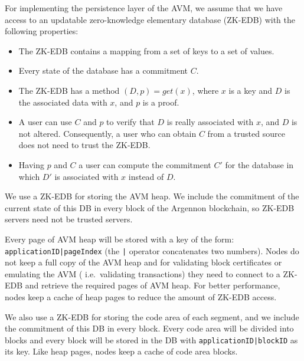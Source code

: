 

For implementing the persistence layer of the AVM, we assume that we have access to an updatable zero-knowledge
elementary database (ZK-EDB) with the following properties:

\begin{itemize}
    \item The ZK-EDB contains a mapping from a set of keys to a set of values.
    \item Every state of the database has a commitment \(C\).
    \item The ZK-EDB has a method \((D, p) = get(x)\), where \(x\) is a key and \(D\) is the associated data
    with \(x\), and \(p\) is a proof.
    \item A user can use \(C\) and \(p\) to verify that \(D\) is really associated with \(x\), and \(D\) is not
    altered. Consequently, a user who can obtain \(C\) from a trusted source does not need to trust the ZK-EDB\@.
    \item Having \(p\) and \(C\) a user can compute the commitment \(C'\) for the database in which \(D'\) is
    associated with \(x\) instead of \(D\).
\end{itemize}

We use a ZK-EDB for storing the AVM heap. We include the commitment of the current state of this DB in every
block of the Argennon blockchain, so ZK-EDB servers need not be trusted servers.

Every page of AVM heap will be stored with a key of the form: \texttt{applicationID|pageIndex} (the \texttt{|}
operator concatenates two numbers). Nodes do not keep a full copy of the AVM heap and for validating block
certificates or emulating the AVM ( i.e.~validating transactions) they need to connect to a ZK-EDB and retrieve
the required pages of AVM heap. For better performance, nodes keep a cache of heap pages to
reduce the amount of ZK-EDB access.

We also use a ZK-EDB for storing the code area of each segment, and we include the commitment of this DB in every
block. Every code area will be divided into blocks and every block will be stored in the DB with
\texttt{applicationID|blockID} as its key. Like heap pages, nodes keep a cache of code area blocks.

